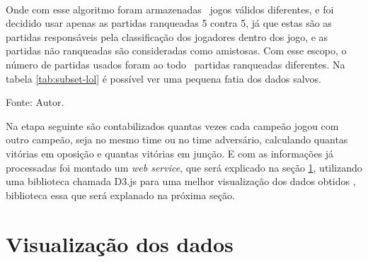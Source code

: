 \

Onde com esse algoritmo foram armazenadas \numpartidas\ jogos válidos diferentes, e foi decidido usar apenas as partidas ranqueadas 5 contra 5, já que estas são as partidas responsáveis pela classificação dos jogadores dentro dos jogo, e as partidas não ranqueadas são consideradas como amistosas.
Com esse escopo, o número de partidas usados foram ao todo \partidasrankeds\ partidas ranqueadas diferentes.
Na tabela \ref{tab:subset-lol} é possível ver uma pequena fatia dos dados salvos.


\begin{table}[H]
\centering
\caption{Exemplo de \textit{subset} salvo no banco de dados}
\label{tab:subset-lol}
\small{Fonte: Autor.}
\end{table}

Na etapa seguinte são contabilizados quantas vezes cada campeão jogou com outro campeão, seja no mesmo time ou no time adversário, calculando quantas vitórias em oposição e quantas vitórias em junção.
E com as informações já processadas foi montado um \textit{web service}, que será explicado na seção \ref{chap:web}, utilizando uma biblioteca chamada D3.js para uma melhor visualização dos dados obtidos , biblioteca essa que será explanado na próxima seção.

\section{Visualização dos dados}
\label{chap:web}

